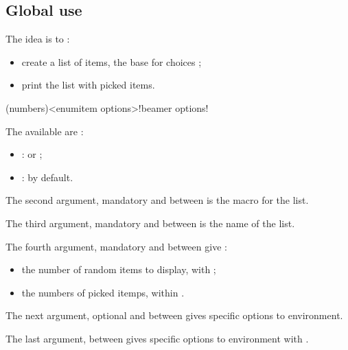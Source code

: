 \documentclass[english,11pt,a4paper]{article}
\begin{document}
\subsection{Global use}

The idea is to :

\begin{itemize}
	\item create a list of items, the base for choices ;
	\item print the list with picked items.
\end{itemize}

\begin{codehigh}[language=latex/latex3,style/main=teal!25,style/code=teal!25]
\end{codehigh}

\begin{codehigh}[language=latex/latex3,style/main=teal!25,style/code=teal!25]
(numbers)<enumitem options>!beamer options!
\end{codehigh}

The available  are :

\begin{itemize}
	\item {} :  or  ;
	\item {}  :  by default.
\end{itemize}

The second argument, mandatory and between  is the macro for the list.

The third argument, mandatory and between  is the name of the list.

The fourth argument, mandatory and between  give :

\begin{itemize}
	\item the number of random items to display, with  ;
	\item the numbers of picked itemps, within .
\end{itemize}

The next argument, optional and between  gives specific options to  environment.

The last argument, between  gives specific options to  environment with .
\end{document}
